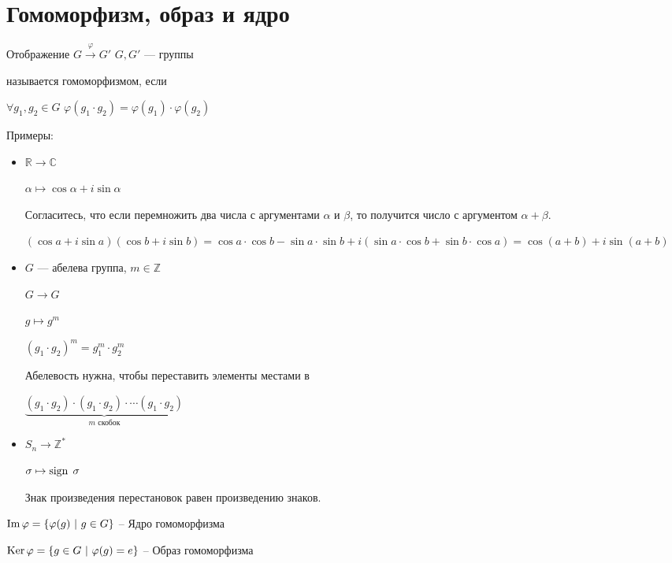 \section{Гомоморфизм, образ и ядро}

\begin{conj}
    Отображение $G \stackrel{\varphi}{\longrightarrow} G'$ $G, G'$ --- группы
  
    называется гомоморфизмом, если 
  
    $\forall g_1, g_2 \in G$ $\varphi(g_1 \cdot g_2) = \varphi(g_1) \cdot \varphi(g_2)$
  \end{conj}
  
  Примеры:
  \begin{itemize}
    \item $\mathbb{R} \longrightarrow \mathbb{C}$
    
    $\alpha \mapsto \cos{\alpha} + i\sin{\alpha}$
  
    Согласитесь, что если перемножить два числа с аргументами $\alpha$ и $\beta$, то получится число с аргументом $\alpha + \beta$.
  
    $(\cos{a} + i\sin{a})(\cos{b} + i\sin{b}) = \cos{a}\cdot\cos{b} - \sin{a}\cdot\sin{b} + i(\sin{a}\cdot\cos{b} + \sin{b}\cdot\cos{a}) = \cos(a + b) + i\sin(a + b)$
  
    \item $G$ --- абелева группа, $m\in \mathbb{Z}$
    
    $G \longrightarrow G$
  
    $g \mapsto g^m$
  
    $(g_1 \cdot g_2)^m = g_1^m \cdot g_2^m$
    
    Абелевость нужна, чтобы переставить элементы местами в 
    
    $\underbrace{(g_1 \cdot g_2) \cdot (g_1 \cdot g_2) \cdot \cdots (g_1 \cdot g_2)}_{m \text{ скобок}}$
  
    \item  $S_n \longrightarrow \mathbb{Z}^*$
  
    $\sigma \mapsto \operatorname{sign \;} \sigma$
  
    Знак произведения перестановок равен произведению знаков.
  \end{itemize}
  
  \begin{conj} \quad 

    $\operatorname{Im} {\varphi} = \{ \varphi(g)\ |\ g\in G \}$ -- Ядро гомоморфизма
  
    $\operatorname{Ker}{\varphi} = \{ g \in G\ |\ \varphi(g) = e \}$ -- Образ гомоморфизма
  \end{conj}
  
